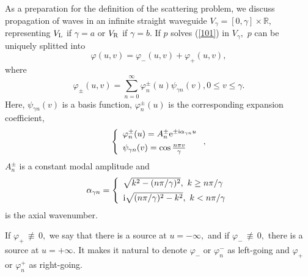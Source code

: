 \documentclass[numreferences]{kluwer}
\renewcommand{\phi}{\varphi}
\begin{document}
As a preparation for the definition of the scattering problem, we
discuss propagation of waves in an infinite straight waveguide
$V_{\gamma}=[0,\gamma]\times\mathbb{R},$ representing $V_{\rm L}$ if
$\gamma=a$ or $V_{\rm R}$ if $\gamma=b$. If $p$ solves (\ref{101}) in
$V_{\gamma},$ $p$ can be uniquely splitted into%
\begin{equation}
  \phi(u,v)=\phi_{-}(u,v)+\phi_{+}(u,v), \label{103}%
\end{equation}
where%
\begin{equation}\label{103.2}
  \phi_{\pm}(u,v)=\sum_{n=0}^{\infty}\phi_{n}^{\pm}(u)\psi
  _{\gamma n}(v),0\leq v\leq \gamma.
\end{equation}
Here, $\psi _{\gamma n}(v)$ is a basis function, $\phi_{n}^{\pm}(u)$
is the corresponding expansion coefficient,
\begin{equation}
  \left\{
    \begin{array}
      [c]{l}%
      \phi_{n}^{\pm}(u)=A_{n}^{\pm}\text{e}^{\pm\text{i}\alpha_{\gamma n}u}\\[1ex]%
      \psi
      _{\gamma n}(v)=\cos\frac{n\pi v}{\gamma}
    \end{array}
  \right.  , \label{103.4}%
\end{equation}
$A_{n}^{\pm}$ is a constant modal amplitude and
\begin{equation}
  \alpha_{\gamma n}=\left\{
    \begin{array}
      [c]{l}%
      \sqrt{k^{2}-(n\pi/\gamma)^{2}},\text{ }k\geq n\pi/\gamma\\[1ex]%
      \text{i}\sqrt{(n\pi/\gamma)^{2}-k^{2}},\text{ }k<n\pi/\gamma%
    \end{array}
  \right.   \label{106}%
\end{equation}
is the axial wavenumber.

If $\phi_{+}\,\nequiv\, 0,$ we say that there is a source at
$u=-\infty,$ and if $\phi_{-}\,\nequiv\, 0,$ there is a source at
$u=+\infty.$ It makes it natural to denote $\phi_{-}$ or
$\phi_{n}^{-}$ as left-going and $\phi_{+}$ or $\phi_{n}^{+}$ as
right-going.
\end{document}

